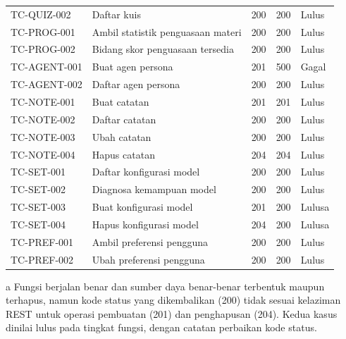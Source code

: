 \documentclass[12pt,a4paper]{article}
\begin{document}
\begin{table}[h]
\begin{tabular}{lllll}
TC-QUIZ-002 & Daftar kuis & 200 & 200 & Lulus \\

TC-PROG-001 & Ambil statistik penguasaan materi & 200 & 200 & Lulus \\

TC-PROG-002 & Bidang skor penguasaan tersedia & 200 & 200 & Lulus \\

TC-AGENT-001 & Buat agen persona & 201 & 500 & Gagal \\

TC-AGENT-002 & Daftar agen persona & 200 & 200 & Lulus \\

TC-NOTE-001 & Buat catatan & 201 & 201 & Lulus \\

TC-NOTE-002 & Daftar catatan & 200 & 200 & Lulus \\

TC-NOTE-003 & Ubah catatan & 200 & 200 & Lulus \\

TC-NOTE-004 & Hapus catatan & 204 & 204 & Lulus \\

TC-SET-001 & Daftar konfigurasi model & 200 & 200 & Lulus \\

TC-SET-002 & Diagnosa kemampuan model & 200 & 200 & Lulus \\

TC-SET-003 & Buat konfigurasi model & 201 & 200 & Lulusa \\

TC-SET-004 & Hapus konfigurasi model & 204 & 200 & Lulusa \\

TC-PREF-001 & Ambil preferensi pengguna & 200 & 200 & Lulus \\

TC-PREF-002 & Ubah preferensi pengguna & 200 & 200 & Lulus \\

\bottomrule

\end{tabular}

\end{table}

a Fungsi berjalan benar dan sumber daya benar-benar terbentuk maupun terhapus, namun kode status yang dikembalikan (200) tidak sesuai kelaziman REST untuk operasi pembuatan (201) dan penghapusan (204). Kedua kasus dinilai lulus pada tingkat fungsi, dengan catatan perbaikan kode status.
\end{document}
